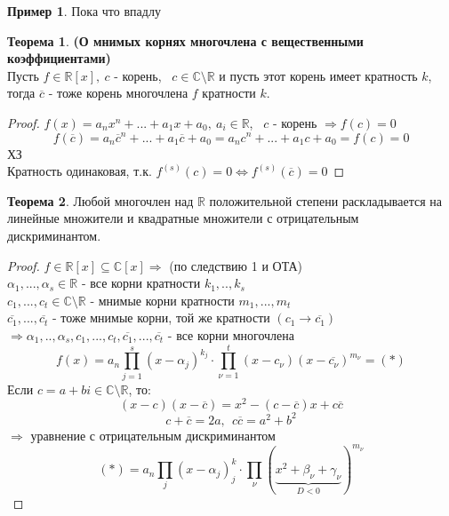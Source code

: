 \documentclass[a4paper, 12pt]{article}
\newcommand{\R}{\mathbb R}
\theoremstyle{definition}
\newtheorem*{theorem}{Теорема}
\newtheorem*{example1}{Пример}
\begin{document}
  \begin{example1}
    Пока что впадлу
  \end{example1}
  \begin{theorem}\textbf{(О мнимых корнях многочлена с вещественными коэффициентами)} \\
    Пусть $f \in \R[x], \ c$ - корень, \ $c \in \mathbb{C}\setminus \R$ и пусть этот корень имеет кратность $k$, тогда $\overline{c}$ - тоже корень многочлена $f$ кратности $k$.     
  \end{theorem} 
  \begin{proof}
    $f(x) = a_nx^n+...+a_1x+a_0, \ a_i \in \R$, \ $c$ - корень $\Longrightarrow f(c) =0$  
    $$f(\overline{c}) = a_n\overline{c}^n+...+a_1\overline{c}+a_0 = a_nc^n+...+a_1c+a_0 = f(c) = 0$$  ХЗ \\
    Кратность одинаковая, т.к. $f^{(s)}(c)=0 \Longleftrightarrow f^{(s)}( \overline{c})=0$ 
  \end{proof}
  \begin{theorem}
    Любой многочлен над $\R$ положительной степени раскладывается на линейные множители и квадратные множители с отрицательным дискриминантом.
  \end{theorem}
  \begin{proof}
    $f\in \R[x] \subseteq \mathbb{C}[x] \Longrightarrow $ (по следствию 1 и ОТА) \\
    $\alpha_1,...,\alpha_s \in \R$ - все корни кратности $k_1,..,k_s$\\
    $c_1,...,c_t \in \mathbb{C}\setminus \R$ - мнимые корни кратности $m_1,...,m_t$\\
    $\overline{c_1},...,\overline{c_t}$ - тоже мнимые корни, той же кратности $(c_1 \to \overline{c_1})$\\
    $\Longrightarrow \alpha_1,..,\alpha_s,c_1,...,c_t,\overline{c_1},...,\overline{c_t}$ - все корни многочлена
    $$f(x) = a_n \prod\limits_{j=1}^{s}(x-\alpha_j)^{k_j} \cdot \prod\limits_{\nu=1}^{t}(x-c_{\nu})(x-\overline{c_{\nu}})^{m_\nu} = (*)$$
    Если $c=a+bi \in \mathbb{C}\setminus \R$, то:
    $$(x-c)(x-\overline{c}) = x^2 - (c-\overline{c})x + c \overline{c}$$
    $$c+\overline{c} = 2a, \ \ c \overline{c} = a^2 + b^2$$
    $\Longrightarrow $ уравнение с отрицательным дискриминантом    
    $$(*) = a_n \prod\limits_{j}(x-\alpha_j)^k_j \cdot \prod\limits_{\nu}(\underbrace{x^2+\beta_{\nu}+ \gamma_{\nu}}_{D<0})^{m_\nu} $$    
  \end{proof}
\end{document}
